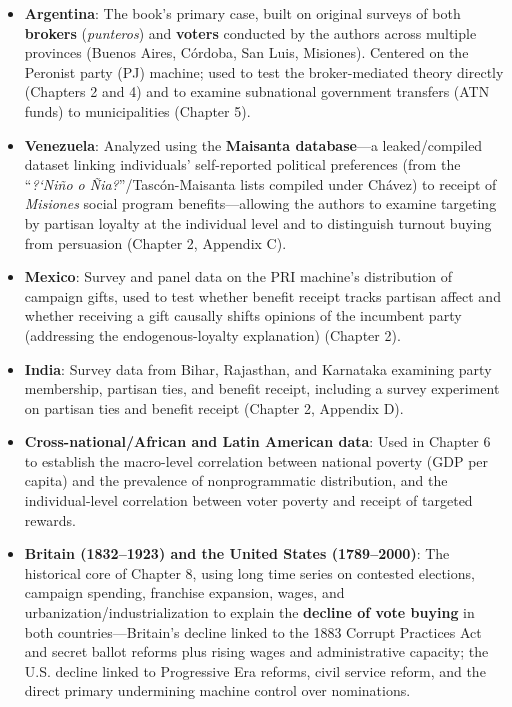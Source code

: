 \documentclass[12pt]{article}
\begin{document}
\begin{itemize}[leftmargin=*, itemsep=4pt]
    \item \textbf{Argentina}: The book's primary case, built on original surveys of both \textbf{brokers} (\emph{punteros}) and \textbf{voters} conducted by the authors across multiple provinces (Buenos Aires, C\'ordoba, San Luis, Misiones). Centered on the Peronist party (PJ) machine; used to test the broker-mediated theory directly (Chapters 2 and 4) and to examine subnational government transfers (ATN funds) to municipalities (Chapter 5).
    \item \textbf{Venezuela}: Analyzed using the \textbf{Maisanta database}---a leaked/compiled dataset linking individuals' self-reported political preferences (from the ``\emph{?`Ni\~no o \~Nia?}''/Tasc\'on-Maisanta lists compiled under Ch\'avez) to receipt of \emph{Misiones} social program benefits---allowing the authors to examine targeting by partisan loyalty at the individual level and to distinguish turnout buying from persuasion (Chapter 2, Appendix C).
    \item \textbf{Mexico}: Survey and panel data on the PRI machine's distribution of campaign gifts, used to test whether benefit receipt tracks partisan affect and whether receiving a gift causally shifts opinions of the incumbent party (addressing the endogenous-loyalty explanation) (Chapter 2).
    \item \textbf{India}: Survey data from Bihar, Rajasthan, and Karnataka examining party membership, partisan ties, and benefit receipt, including a survey experiment on partisan ties and benefit receipt (Chapter 2, Appendix D).
    \item \textbf{Cross-national/African and Latin American data}: Used in Chapter 6 to establish the macro-level correlation between national poverty (GDP per capita) and the prevalence of nonprogrammatic distribution, and the individual-level correlation between voter poverty and receipt of targeted rewards.
    \item \textbf{Britain (1832--1923) and the United States (1789--2000)}: The historical core of Chapter 8, using long time series on contested elections, campaign spending, franchise expansion, wages, and urbanization/industrialization to explain the \textbf{decline of vote buying} in both countries---Britain's decline linked to the 1883 Corrupt Practices Act and secret ballot reforms plus rising wages and administrative capacity; the U.S. decline linked to Progressive Era reforms, civil service reform, and the direct primary undermining machine control over nominations.
\end{itemize}
\end{document}
